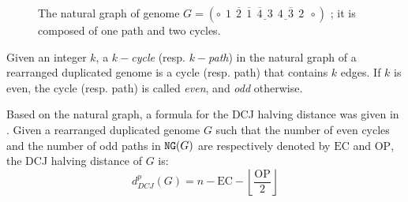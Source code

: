 \documentclass{llncs}
\newcommand{\fst}[1]{ \ensuremath{#1} }
\newcommand{\snd}[1]{ \ensuremath{\overline{#1}} }
\newcommand\paff[2]{\ensuremath{\fst{#1}~~\fst{#2}}}
\newcommand\pasf[2]{\ensuremath{\snd{#1}~~\fst{#2}}}
\newcommand\pafs[2]{\ensuremath{\fst{#1}~~\snd{#2}}}
\newcommand\pass[2]{\ensuremath{\snd{#1}~~\snd{#2}}}
\renewcommand{\NG}{\ensuremath{\mbox{\texttt{NG}}}}
\begin{document}
 
\begin{figure}[htbp]
    \centering
{}

\caption{The natural graph of genome $G = (\circ~~ \fst{1}~~\snd{2}~~\snd{1}~~\underline{\snd{4}~~\fst{3}}~~\underline{\fst{4}~~\snd{3}}~~\fst{2}~~\circ)$ ; it is composed of one path and two cycles.}
\label{fig:NGdef}
\end{figure}



\begin{definition}
    Given an integer $k$, a \emph{$k-$cycle} (resp. \emph{$k-$path}) in the 
    natural graph of a rearranged duplicated genome is a cycle (resp. path) 
    that contains $k$ edges. If $k$ is even, the cycle (resp. path) is called 
   \emph{even}, and \emph{odd} otherwise.
\end{definition}

\def\EC{\ensuremath{\mbox{EC}}}
\def\OP{\ensuremath{\mbox{OP}}}

Based on the natural graph, a formula for the DCJ halving distance was given in \cite{Mixtacki08}. Given a rearranged duplicated genome $G$ such that the number of even cycles and the number of odd paths in $\NG(G)$
are respectively denoted by $\EC$  and $\OP$, the  DCJ halving distance of $G$ is:
    $$d^p_{DCJ}(G) = n - \EC - \left\lfloor \frac{\OP}{2} \right\rfloor $$
\end{document}
